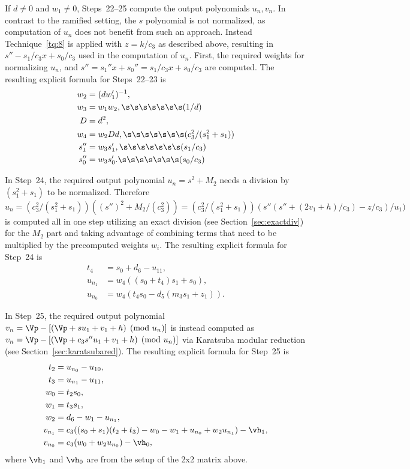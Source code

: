 If $d \neq 0$ and $w_1 \neq 0$, Steps~22--25 compute the output polynomials
$u_n, v_n$. In contrast to the ramified setting, the $s$ polynomial is not
normalized, as computation of $u_n$ does not benefit from such an approach.
Instead Technique~\ref{tq:8} is applied with $z = k/c_3$ as described above,
resulting in $s'' - s_1/c_3x + s_0/c_3$ used in the computation of $u_n$.
First, the required weights for normalizing $u_n$, and $s'' = s_1''x + s_0'' =
s_1/c_3x + s_0/c_3$ are computed. The resulting explicit formula for Steps~22--23 is
\begin{align*} 
    w_2 &= (dw_1')^{-1},\\
    w_3 &= w_1w_2, \s\s\s\s\s\s\s (1/d)\\
    D   &= d^2,\\
    w_4 &= w_2Dd, \s\s\s\s\s\s\s (c_3^2/(s_1^2 + s_1))\\
    s_1'' &= w_3s_1',\s\s\s\s\s\s\s (s_1/c_3)\\
    s_0'' &= w_3s_0'.\s\s\s\s\s\s\s (s_0/c_3)
\end{align*}

In Step~24, the required output polynomial $u_n = s^2 + M_2$ needs a division
by $(s_1^2 + s_1)$ to be normalized. Therefore 
$$ u_n = (c_3^2/(s_1^2 + s_1))((s'')^2 + M_2/(c_3^2)) = (c_3^2/(s_1^2 +
s_1))(s''(s'' + (2v_1+ h)/c_3) - z/c_3)/u_1)$$ is computed all in one step
utilizing an exact division (see Section~\ref{sec:exactdiv}) for the $M_2$ part and
taking advantage of combining terms that need to be multiplied by the
precomputed weights $w_i$. The resulting explicit formula for Step~24 is
\begin{align*}
    t_4     &= s_0 + d_6 - u_{11},\\
    u_{n_1} &= w_4((s_0 + t_4)s_1 + s_0),\\
    u_{n_0} &= w_4(t_4s_0 - d_5(m_3s_1 + z_1)).
\end{align*}

In Step~25, the required output polynomial $v_n = \Vp - [(\Vp + su_1 + v_1 + h)
\pmod{u_n}]$ is instead computed as $v_n = \Vp - [(\Vp + c_3s''u_1 + v_1 + h)
\pmod{u_n}]$ via Karatsuba modular reduction (see
Section~\ref{sec:karatsubared}). The resulting explicit formula for Step~25 is 
\begin{align*}  
    t_2 &= u_{n_0} - u_{10}, \\
    t_3 &= u_{n_1} - u_{11},\\
    w_0 &= t_2s_0,\\
    w_1 &= t_3s_1,\\    
    w_2 &= d_6 - w_1 - u_{n_1},\\
    v_{n_1} &= c_3((s_0 + s_1)(t_2 + t_3) - w_0 - w_1 + u_{n_0} + w_2u_{n_1}) - \vh_1,\\
    v_{n_0} &= c_3(w_0 + w_2u_{n_0}) - \vh_0,
\end{align*}
where $\vh_1$ and $\vh_0$ are from the setup of the 2x2 matrix above.

